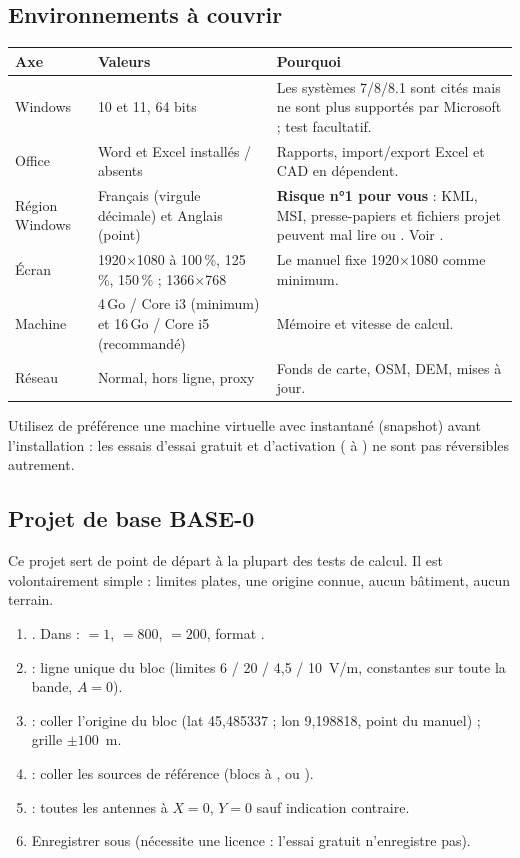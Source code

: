 \subsection{Environnements à couvrir}
\begin{center}\small\renewcommand{\arraystretch}{1.15}
\begin{tabular}{@{}lY{5.2cm}Y{7.6cm}@{}}\toprule
\textbf{Axe} & \textbf{Valeurs} & \textbf{Pourquoi}\\\midrule
Windows & 10 et 11, 64 bits & Les systèmes 7/8/8.1 sont cités mais ne sont plus supportés par Microsoft ; test facultatif.\\
Office & Word et Excel installés / absents & Rapports, import/export Excel et CAD en dépendent.\\
Région Windows & Français (virgule décimale) et Anglais (point) & \textbf{Risque n°1 pour vous} : KML, MSI, presse-papiers et fichiers projet peuvent mal lire  ou . Voir .\\
Écran & 1920$\times$1080 à 100\,\%, 125\,\%, 150\,\% ; 1366$\times$768 & Le manuel fixe 1920$\times$1080 comme minimum.\\
Machine & 4\,Go / Core i3 (minimum) et 16\,Go / Core i5 (recommandé) & Mémoire et vitesse de calcul.\\
Réseau & Normal, hors ligne, proxy & Fonds de carte, OSM, DEM, mises à jour.\\\bottomrule
\end{tabular}\end{center}
Utilisez de préférence une machine virtuelle avec instantané (snapshot) avant l'installation : les essais d'essai gratuit et d'activation ( à ) ne sont pas réversibles autrement.

\subsection{Projet de base BASE-0}\label{sec:base}
Ce projet sert de point de départ à la plupart des tests de calcul. Il est volontairement simple : limites plates, une origine connue, aucun bâtiment, aucun terrain.
\begin{enumerate}
\item {}. Dans  :  $=1$,  $=800$,  $=200$, format .
\item {} : ligne unique du bloc  (limites 6 / 20 / 4,5 / 10~V/m, constantes sur toute la bande, $A=0$).
\item {} : coller l'origine du bloc  (lat 45,485337 ; lon 9,198818, point du manuel) ; grille $\pm100$~m.
\item {} : coller les sources de référence (blocs  à , ou ).
\item {} : toutes les antennes à $X=0$, $Y=0$ sauf indication contraire.
\item Enregistrer sous  (nécessite une licence : l'essai gratuit n'enregistre pas).
\end{enumerate}

